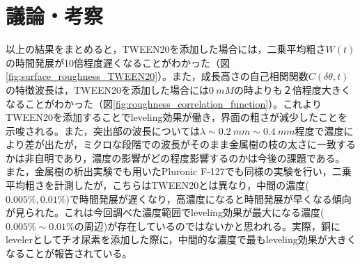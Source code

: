 \documentclass[autodetect-engine,dvi=dvipdfmx,a4paper,ja=standard,oneside,openany,11pt,draft]{bxjsbook}
\begin{document}
\section{議論・考察}
以上の結果をまとめると，TWEEN20を添加した場合には，二乗平均粗さ$W(t)$の時間発展が10倍程度遅くなることがわかった（図\ref{fig:surface_roughness_TWEEN20}）。また，成長高さの自己相関関数$C(\delta\theta,t)$の特徴波長は，TWEEN20を添加した場合には$\SI{0}{mM}$の時よりも２倍程度大きくなることがわかった（図\ref{fig:roughness_correlation_function}）。これよりTWEEN20を添加することでleveling効果が働き，界面の粗さが減少したことを示唆される。また，突出部の波長については$\lambda\sim\SI{0.2}{mm}\sim\SI{0.4}{mm}$程度で濃度により差が出たが，ミクロな段階での波長がそのまま金属樹の枝の太さに一致するかは非自明であり，濃度の影響がどの程度影響するのかは今後の課題である。\\
また，金属樹の析出実験でも用いたPluronic F-127でも同様の実験を行い，二乗平均粗さを計測したが，こちらはTWEEN20とは異なり，中間の濃度($0.005\%,0.01\%$)で時間発展が遅くなり，高濃度になると時間発展が早くなる傾向が見られた。これは今回調べた濃度範囲でleveling効果が最大になる濃度($0.005\%\sim0.01\%$の周辺)が存在しているのではないかと思われる。実際，銅にlevelerとしてチオ尿素を添加した際に，中間的な濃度で最もleveling効果が大きくなることが報告されている\cite{schilardi2000stable}。
\ifdraft{
  
  
}{}
\end{document}
